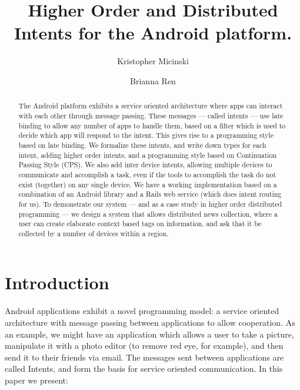 \documentclass{acm_proc_article-sp}
\begin{document}
\title{Higher Order and Distributed Intents for the Android platform.}

\author{
Kristopher Micinski\\
\and
Brianna Ren\\
}

\maketitle

\begin{abstract}
  The Android platform exhibits a service oriented architecture where
  apps can interact with each other through message passing.  These
  messages --- called intents --- use late binding to allow any number
  of apps to handle them, based on a filter which is used to decide
  which app will respond to the intent.  This gives rise to a
  programming style based on late binding.  We formalize these
  intents, and write down types for each intent, adding higher order
  intents, and a programming style based on Continuation Passing Style
  (CPS).  We also add inter device intents, allowing multiple devices
  to communicate and accomplish a task, even if the tools to
  accomplish the task do not exist (together) on any single device.
  We have a working implementation based on a combination of an
  Android library and a Rails web service (which does intent routing
  for us).  To demonstrate our system --- and as a case study in
  higher order distributed programming --- we design a system that
  allows distributed news collection, where a user can create
  elaborate context based tags on information, and ask that it be
  collected by a number of devices within a region.
\end{abstract}

\section{Introduction}
Android applications exhibit a novel programming model: a service
oriented architecture with message passing between applications to
allow cooperation.  As an example, we might have an application which
allows a user to take a picture, manipulate it with a photo editor (to
remove red eye, for example), and then send it to their friends via
email.  The messages sent between applications are called Intents, and
form the basis for service oriented communication.  In this paper we
present:
\end{document}
